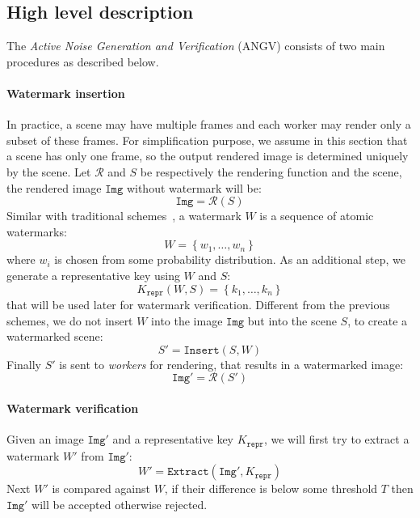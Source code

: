 \documentclass[a4paper,11pt,onecolumn]{memoir}
\begin{document}
\subsection[Hight level description]{High level description}
The \emph{Active Noise Generation and Verification} (ANGV) consists of two main procedures as described below.

\paragraph[Watermark insertion]{Watermark insertion}
In practice, a scene may have multiple frames and each worker may render only a subset of these frames. For simplification purpose, we assume in this section that a scene has only one frame, so the output rendered image is determined uniquely by the scene. Let $\mathcal{R}$ and $S$ be respectively the rendering function and the scene, the rendered image $\mathtt{Img}$ without watermark will be:
\begin{equation*}
    \mathtt{Img} = \mathcal{R}\left(S\right)
\end{equation*}
Similar with traditional schemes~\cite{Cox1999,Cox1997}, a watermark $W$ is a sequence of atomic watermarks:
\begin{equation*}
    W = \left\{ w_1,\dots,w_n \right\}
\end{equation*}
where $w_i$ is chosen from some probability distribution. As an additional step, we generate a representative key using $W$ and $S$:
\begin{equation*}
    K_{\mathtt{repr}} \left(W,S\right) = \left\{ k_1,\dots,k_n \right\}
\end{equation*}
that will be used later for watermark verification. Different from the previous schemes, we do not insert $W$ into the image $\mathtt{Img}$ but into the scene $S$, to create a watermarked scene:
\begin{equation*}
    S' = \mathtt{Insert} \left(S, W\right)
\end{equation*}
Finally $S'$ is sent to \emph{workers} for rendering, that results in a watermarked image:
\begin{equation*}
    \mathtt{Img'} = \mathcal{R}\left(S'\right)
\end{equation*}

\paragraph[Watermark verification]{Watermark verification}
Given an image $\mathtt{Img}'$ and a representative key $K_{\mathtt{repr}}$, we will first try to extract a watermark $W'$ from $\mathtt{Img}'$:
\begin{equation*}
    W' = \mathtt{Extract}\left(\mathtt{Img}', K_{\mathtt{repr}}\right)
\end{equation*}
Next $W'$ is compared against $W$, if their difference is below some threshold $T$ then $\mathtt{Img'}$ will be accepted otherwise rejected.
\end{document}

